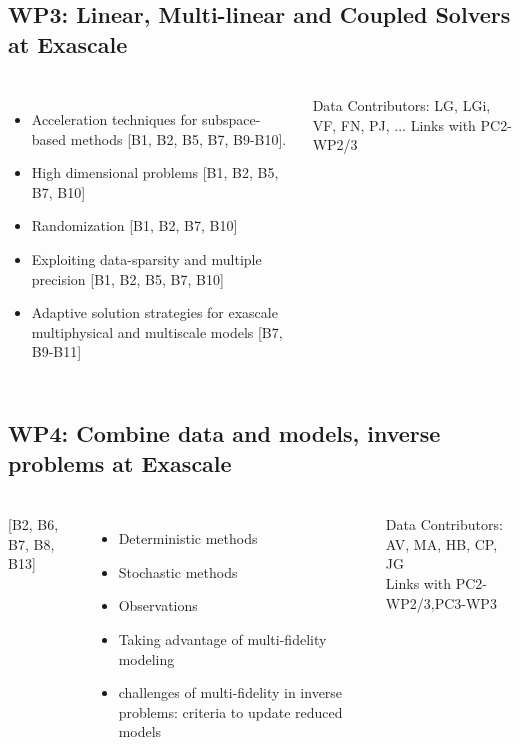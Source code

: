 \subsection{WP3: Linear, Multi-linear and Coupled Solvers at Exascale}
\begin{frame}
  \frametitle{\insertsectionhead}
  \framesubtitle{\insertsubsectionhead}
  \begin{columns}
    \begin{itemize}
      \item Acceleration techniques for subspace-based methods [B1, B2, B5, B7, B9-B10].
      \item High dimensional problems [B1, B2, B5, B7, B10] 
      \item Randomization [B1, B2, B7, B10]
      \item Exploiting data-sparsity and multiple precision [B1, B2, B5, B7, B10]
      \item Adaptive solution strategies for exascale multiphysical and multiscale models [B7, B9-B11] 
    \end{itemize}

    \begin{alertblock}{Data}
    Contributors: LG, LGi, VF, FN, PJ, ...
    Links with PC2-WP2/3   
  \end{alertblock}
  \end{columns}

\end{frame}

\subsection{WP4: Combine data and models, inverse problems at Exascale }
\begin{frame}
  \frametitle{\insertsectionhead}
  \framesubtitle{\insertsubsectionhead}
  \begin{columns}
    [B2, B6, B7, B8, B13]
    \begin{itemize}
      \item Deterministic methods
      \item Stochastic methods
      \item Observations
      \item Taking advantage of multi-fidelity modeling
      \item challenges of multi-fidelity in inverse problems: criteria to update reduced models
    \end{itemize}
    \begin{alertblock}{Data }
    Contributors: AV, MA, HB, CP, JG\\
    Links with PC2-WP2/3,PC3-WP3
  \end{alertblock}
  \end{columns}
\end{frame}

